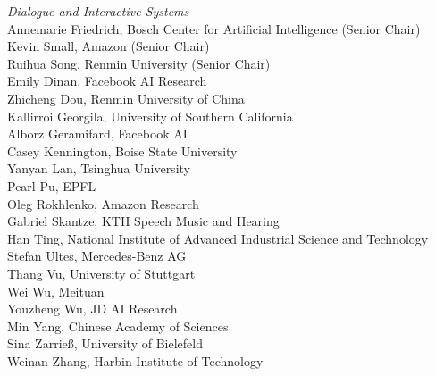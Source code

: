 \emph{Dialogue and Interactive Systems} \\
\hspace*{0.2in} Annemarie Friedrich, Bosch Center for Artificial Intelligence (Senior Chair)\\
\hspace*{0.2in} Kevin Small, Amazon (Senior Chair)\\
\hspace*{0.2in} Ruihua Song, Renmin University (Senior Chair)\\
\hspace*{0.2in} Emily Dinan, Facebook AI Research\\
\hspace*{0.2in} Zhicheng Dou, Renmin University of China\\
\hspace*{0.2in} Kallirroi Georgila, University of Southern California \\
\hspace*{0.2in} Alborz Geramifard, Facebook AI \\
\hspace*{0.2in} Casey Kennington, Boise State University\\
\hspace*{0.2in} Yanyan Lan, Tsinghua University\\
\hspace*{0.2in} Pearl Pu, EPFL\\
\hspace*{0.2in} Oleg Rokhlenko, Amazon Research\\
\hspace*{0.2in} Gabriel Skantze, KTH Speech Music and Hearing\\
\hspace*{0.2in} Han Ting, National Institute of Advanced Industrial Science and Technology\\
\hspace*{0.2in} Stefan Ultes, Mercedes-Benz AG\\
\hspace*{0.2in} Thang Vu, University of Stuttgart\\
\hspace*{0.2in} Wei Wu, Meituan\\
\hspace*{0.2in} Youzheng Wu, JD AI Research\\
\hspace*{0.2in} Min Yang, Chinese Academy of Sciences\\
\hspace*{0.2in} Sina Zarrie{\ss}, University of Bielefeld\\
\hspace*{0.2in} Weinan Zhang, Harbin Institute of Technology\\

